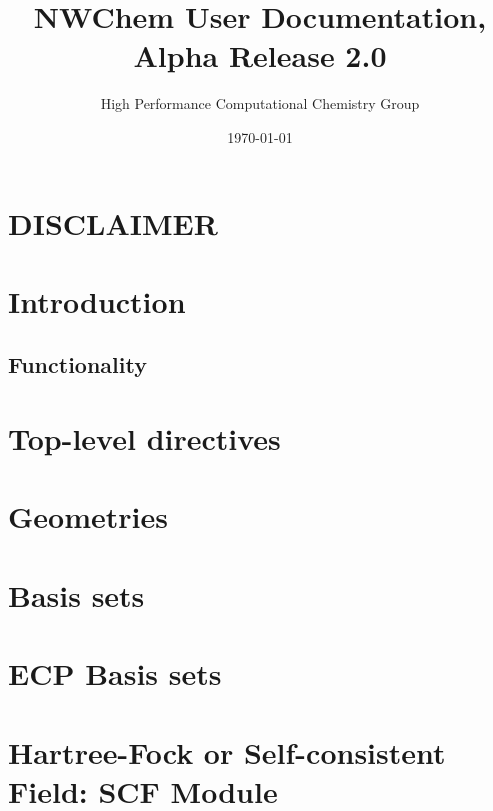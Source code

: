 \setlength{\parskip}{6pt}

\newcommand{\nwchemversion}{2.0}
\newcommand{\nwchemyear}{1996}





\title{\bf\Large NWChem User Documentation, Alpha Release \nwchemversion}
\author{High Performance Computational Chemistry Group}
\date{\today}
\maketitle

\section*{\center DISCLAIMER}


\clearpage

\tableofcontents

\clearpage

\section{Introduction}


\subsection{Functionality}


\section{Top-level directives}


\section{Geometries}


\section{Basis sets}


\section{ECP Basis sets}


\section{Hartree-Fock or Self-consistent Field: SCF Module} 


